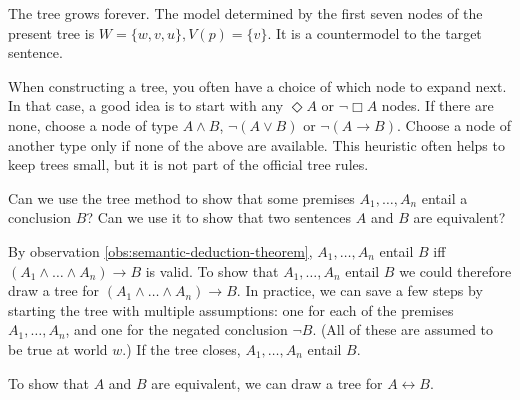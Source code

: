 \begin{solution}

  \medskip\noindent The tree grows forever. The model determined by
  the first seven nodes of the present tree is $W = \{ w,v,u \}, V(p)=\{ v \}$.
  It is a countermodel to the target sentence.
    
\end{solution}

When constructing a tree, you often have a choice of which node to expand next.
In that case, a good idea is to start with any $\Diamond A$ or $\neg \Box A$
nodes. If there are none, choose a node of type $A \land B$, $\neg (A \lor B)$
or $\neg(A \to B)$. Choose a node of another type only if none of the above are
available. This heuristic often helps to keep trees small, but it is not part of
the official tree rules.

\begin{exercise}\label{ex:trees-with-premises}
  Can we use the tree method to show that some premises $A_1,\ldots,A_n$ entail
  a conclusion $B$? Can we use it to show that two sentences $A$ and $B$ are
  equivalent?
\end{exercise}
\begin{solution}
  By observation \ref{obs:semantic-deduction-theorem}, $A_{1},\ldots,A_{n}$
  entail $B$ iff $(A_1\land\ldots\land A_n) \to B$ is valid. To show that
  $A_{1},\ldots,A_{n}$ entail $B$ we could therefore draw a tree for
  $(A_1\land\ldots\land A_n) \to B$. In practice, we can save a few steps by
  starting the tree with multiple assumptions: one for each of the premises
  $A_{1},\ldots, A_{n}$, and one for the negated conclusion $\neg B$. (All of
  these are assumed to be true at world $w$.) If the tree closes,
  $A_1,\ldots,A_n$ entail $B$.

  To show that $A$ and $B$ are equivalent, we can draw a tree for
  $A \leftrightarrow B$.
\end{solution}


